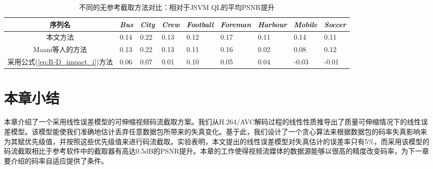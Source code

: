 \begin{table}[t]
	\centering
	\vspace{10pt}
	\caption{不同的无参考截取方法对比：相对于JSVM QL的平均PSNR提升}
	\label{tab:methods-compare}
	\small
	\begin{minipage}{1.0\linewidth}
		\centering
		\begin{tabular}{c|*{3}{p{0.9cm}<{\centering}|}*{4}{p{1.1cm}<{\centering}|}p{0.9cm}<{\centering}}
			\hline \hline
			序列名 & {\em Bus} & {\em City} & {\em Crew} & {\em Football} & {\em Foreman} & {\em Harbour} & {\em Mobile} & {\em Soccer} \\ \hline
			本文方法  & 0.14 & 0.22 & 0.13 & 0.12 & 0.17 & 0.11 & 0.14 & 0.11 \\ \cline{1-9}
			Maani等人的方法\supercite{Maani2009} & 0.13 & 0.22 & 0.13 & 0.11 & 0.16 & 0.02 & 0.08 & 0.12 \\ \cline{1-9}
			采用公式(\ref{eq:R-D_impact_i})方法 & 0.06 & 0.07 & 0.01 & 0.10 & 0.05 & 0.04 & -0.03 & -0.01 \\ \hline
		\end{tabular}
	\end{minipage}
\end{table}

\section{本章小结}

本章介绍了一个采用线性误差模型的可伸缩视频码流截取方案。我们从H.264/AVC解码过程的线性性质推导出了质量可伸缩情况下的线性误差模型。该模型能使我们准确地估计丢弃任意数据包所带来的失真变化。基于此，我们设计了一个贪心算法来根据数据包的码率失真影响来为其赋优先级值，并按照这些优先级值来进行码流截取。实验表明，本文提出的线性误差模型对失真估计的误差率只有5\%，而采用该模型的码流截取相比于参考软件中的截取器有高达0.5dB的PSNR提升。本章的工作使得视频流媒体的数据源能够以很高的精度改变码率，为下一章要介绍的码率自适应提供了条件。